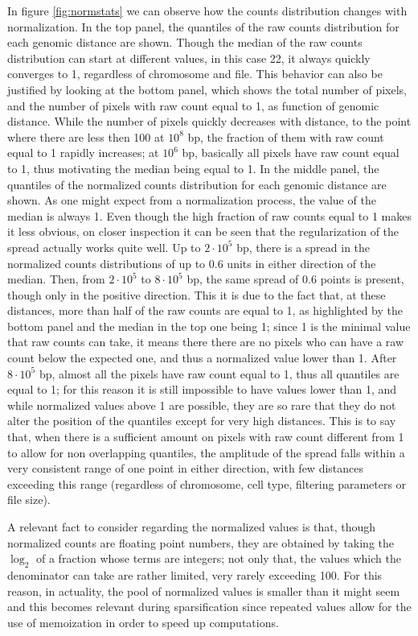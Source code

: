 In figure \ref{fig:normstats} we can observe how the counts distribution changes with normalization. In the top panel, the quantiles of the raw counts distribution for each genomic distance are shown. Though the median of the raw counts distribution can start at different values, in this case 22, it always quickly converges to 1, regardless of chromosome and file. This behavior can also be justified by looking at the bottom panel, which shows the total number of pixels, and the number of pixels with raw count equal to 1, as function of genomic distance. While the number of pixels quickly decreases with distance, to the point where there are less then 100 at $10^8$ bp, the fraction of them with raw count equal to 1 rapidly increases; at $10^6$ bp, basically all pixels have raw count equal to 1, thus motivating the median being equal to 1. In the middle panel, the quantiles of the normalized counts distribution for each genomic distance are shown. As one might expect from a normalization process, the value of the median is always 1. Even though the high fraction of raw counts equal to 1 makes it less obvious, on closer inspection it can be seen that the regularization of the spread actually works quite well. Up to $2 \cdot 10^5$ bp, there is a spread in the normalized counts distributions of up to $0.6$ units in either direction of the median. Then, from $2 \cdot 10^5$ to $8 \cdot 10^5$ bp, the same spread of $0.6$ points is present, though only in the positive direction. This it is due to the fact that, at these distances, more than half of the raw counts are equal to 1, as highlighted by the bottom panel and the median in the top one being 1; since 1 is the minimal value that raw counts can take, it means there there are no pixels who can have a raw count below the expected one, and thus a normalized value lower than 1. After $8 \cdot 10^5$ bp, almost all the pixels have raw count equal to 1, thus all quantiles are equal to 1; for this reason it is still impossible to have values lower than 1, and while normalized values above 1 are possible, they are so rare that they do not alter the position of the quantiles except for very high distances. This is to say that, when there is a sufficient amount on pixels with raw count different from 1 to allow for non overlapping quantiles, the amplitude of the spread falls within a very consistent range of one point in either direction, with few distances exceeding this range (regardless of chromosome, cell type, filtering parameters or file size). 

A relevant fact to consider regarding the normalized values is that, though normalized counts are floating point numbers, they are obtained by taking the $\log_2$ of a fraction whose terms are integers; not only that, the values which the denominator can take are rather limited, very rarely exceeding 100. For this reason, in actuality, the pool of normalized values is smaller than it might seem and this becomes relevant during sparsification since repeated values allow for the use of memoization in order to speed up computations.

